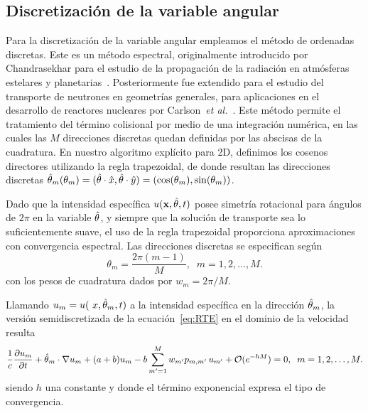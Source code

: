 \subsection{Discretización de la variable angular}
\label{sec:dord}
Para la discretización de la variable angular empleamos el
método de ordenadas discretas. Este es un método espectral, 
originalmente introducido por Chandrasekhar 
para el estudio de la propagación de la radiación en atmósferas 
estelares y planetarias~\cite{Chandrasekhar1960}. 
Posteriormente fue extendido para el estudio 
del transporte de neutrones en geometrías generales, 
para aplicaciones en el desarrollo de reactores nucleares  
por Carlson~\textit{et al.}~\cite{Lathrop1992}. 
Este método permite el tratamiento del término colisional por medio de una 
integración numérica, en las cuales las $M$ direcciones discretas 
quedan definidas por las abscisas de la cuadratura.
En nuestro algoritmo explícito para 2D, definimos los cosenos directores 
utilizando la regla trapezoidal, 
de donde resultan las direcciones discretas 
$\hat{\theta}_m(\theta_m)=(\hat{\theta}\cdot \hat x,\hat{\theta}\cdot \hat y)=(\cos(\theta_m),\sin(\theta_m))$.

Dado que la intensidad específica $u(\mathbf{x},\hat{\theta},t)$ posee simetría rotacional
para ángulos de $2\pi$ en la variable $\hat{\theta}$, y siempre que la solución de 
transporte sea lo suficientemente
suave, el uso de la regla trapezoidal 
proporciona aproximaciones con convergencia espectral. 
Las direcciones discretas se especifican 
según
\begin{equation}
\theta_m=\frac{2\pi(m-1)}{M}, \; \; m=1,2,\ldots,M.
\label{eq:RTETrapz}
\end{equation}
con los pesos de cuadratura dados por $w_{m}=2\pi/M$.

Llamando  $ u_m= u (\ x, \hat{\theta}_m, t)$ a la intensidad específica 
en la dirección $\hat{\theta}_m$, la versión semidiscretizada de la 
ecuación~\eqref{eq:RTE} en el dominio de la velocidad resulta
\begin{equation*}
\frac{1}{c}  \frac{\partial  u_m}{\partial t}  
 + \hat{\theta}_m
\cdot  \nabla u_m + (a+b) u_m
-b\sum_{m'=1}^M w_{m'}
p_{m,m'} \, u_{m'}+\mathcal{O}(e^{-hM}) =0, \; \; m=1,2,\ldots,M.
\label{eq:RTEdom}
\end{equation*}
siendo $h$ una constante y donde el término exponencial expresa el tipo de convergencia.

